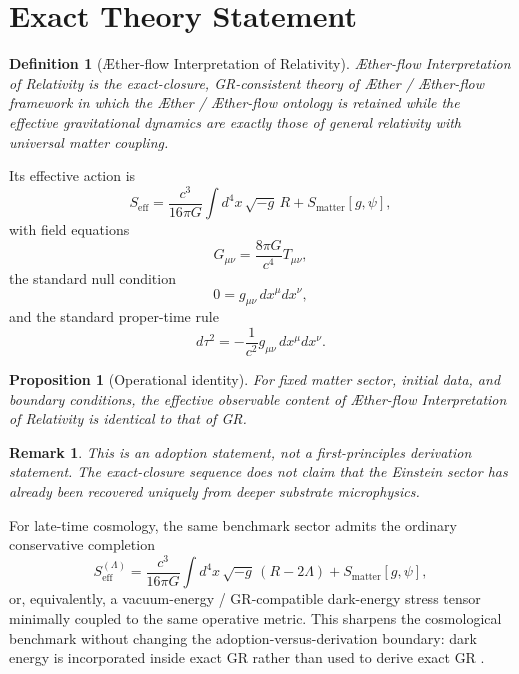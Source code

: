 \documentclass[11pt]{article}
\newcommand{\Aether}{\AE{}ther}
\newcommand{\Aflow}{\AE{}ther-flow}
\newcommand{\TheoryName}{\Aflow{} Interpretation of Relativity}
\newcommand{\TheoryProgram}{\Aether{} / \Aflow{} framework}
\newtheorem{definition}{Definition}
\newtheorem{proposition}{Proposition}
\newtheorem{remark}{Remark}
\begin{document}
\section{Exact Theory Statement}

\begin{definition}[\TheoryName{}]
\TheoryName{} is the exact-closure, GR-consistent theory of \TheoryProgram{} in which the \Aether{} / \Aflow{} ontology is retained while the effective gravitational dynamics are exactly those of general relativity with universal matter coupling.
\end{definition}

Its effective action is
\begin{equation}
S_{\mathrm{eff}}
=
\frac{c^3}{16\pi G}\int d^4x\,\sqrt{-g}\,R
+
S_{\mathrm{matter}}[g,\psi],
\label{eq:SA}
\end{equation}
with field equations
\begin{equation}
G_{\mu\nu}
=
\frac{8\pi G}{c^4}T_{\mu\nu},
\label{eq:einstein}
\end{equation}
the standard null condition
\begin{equation}
0=g_{\mu\nu}\,dx^\mu dx^\nu,
\label{eq:null}
\end{equation}
and the standard proper-time rule
\begin{equation}
d\tau^2=-\frac{1}{c^2}g_{\mu\nu}\,dx^\mu dx^\nu.
\label{eq:propertime}
\end{equation}

\begin{proposition}[Operational identity]
For fixed matter sector, initial data, and boundary conditions, the effective observable content of \TheoryName{} is identical to that of GR.
\end{proposition}

\begin{remark}
This is an adoption statement, not a first-principles derivation statement. The exact-closure sequence does not claim that the Einstein sector has already been recovered uniquely from deeper substrate microphysics.
\end{remark}

For late-time cosmology, the same benchmark sector admits the ordinary conservative completion
\begin{equation}
S_{\mathrm{eff}}^{(\Lambda)}
=
\frac{c^3}{16\pi G}\int d^4x\,\sqrt{-g}\,\left(R-2\Lambda\right)
+
S_{\mathrm{matter}}[g,\psi],
\label{eq:SA_lambda}
\end{equation}
or, equivalently, a vacuum-energy / GR-compatible dark-energy stress tensor minimally coupled to the same operative metric. This sharpens the cosmological benchmark without changing the adoption-versus-derivation boundary: dark energy is incorporated inside exact GR rather than used to derive exact GR \cite{Riess1998,Perlmutter1999,Planck2018Parameters}.
\end{document}
